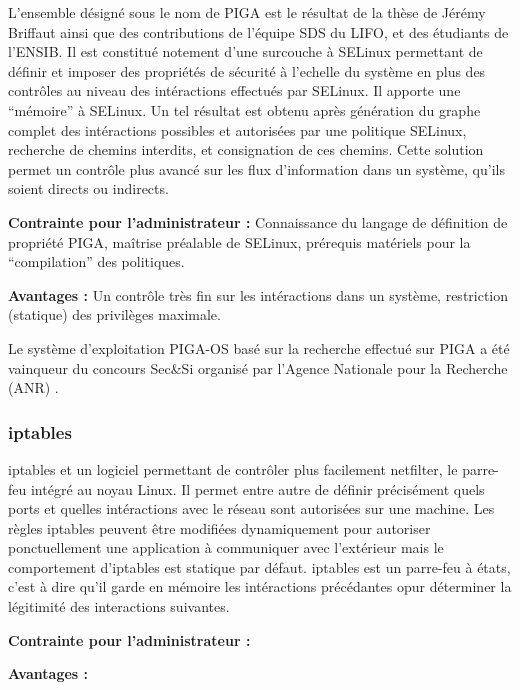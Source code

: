 L'ensemble désigné sous le nom de PIGA est le résultat de la thèse de Jérémy Briffaut ainsi que des contributions de l'équipe SDS du LIFO, et des étudiants de l'ENSIB. Il est constitué notement d'une surcouche à SELinux permettant de définir et imposer des propriétés de sécurité à l'echelle du système en plus des contrôles au niveau des intéractions effectués par SELinux. Il apporte une ``mémoire'' à SELinux. Un tel résultat est obtenu après génération du graphe complet des intéractions possibles et autorisées par une politique SELinux, recherche de chemins interdits, et consignation de ces chemins. Cette solution permet un contrôle plus avancé sur les flux d'information dans un système, qu'ils soient directs ou indirects.

\begin{list}{}{}
 \item \textbf{Contrainte pour l'administrateur :} Connaissance du langage de définition de propriété PIGA, maîtrise préalable de SELinux, prérequis matériels pour la ``compilation'' des politiques.
 \item \textbf{Avantages :} Un contrôle très fin sur les intéractions dans un système, restriction (statique) des privilèges maximale.
\end{list}

Le système d'exploitation PIGA-OS basé sur la recherche effectué sur PIGA a été vainqueur du concours Sec\&Si organisé par l'Agence Nationale pour la Recherche (ANR) \cite{PIGA}\cite{PIGA2}.

\subsubsection{iptables}

iptables et un logiciel permettant de contrôler plus facilement netfilter, le parre-feu intégré au noyau Linux. Il permet entre autre de définir précisément quels ports et quelles intéractions avec le réseau sont autorisées sur une machine. Les règles iptables peuvent être modifiées dynamiquement pour autoriser ponctuellement une application à communiquer avec l'extérieur mais le comportement d'iptables est statique par défaut. iptables est un parre-feu à états, c'est à dire qu'il garde en mémoire les intéractions précédantes opur déterminer la légitimité des interactions suivantes.

\begin{list}{}{}
 \item \textbf{Contrainte pour l'administrateur :}
 \item \textbf{Avantages :}
\end{list}

